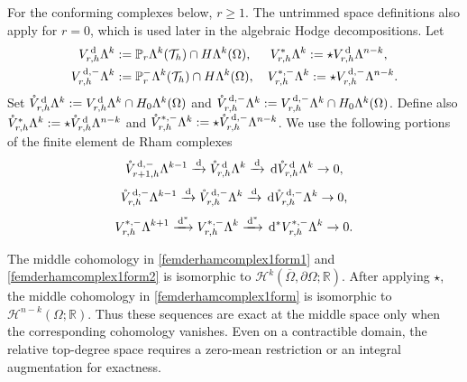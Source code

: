 \documentclass[10pt]{amsart}
\numberwithin{equation}{section}
\newcommand{\dd}{\,{\rm d}}
\begin{document}
For the conforming complexes below, $r\geq1$.
The untrimmed space definitions also apply for $r=0$, which is used later in the algebraic Hodge decompositions.
Let 
\begin{align*}
	V_{r,h}^{\dd}\Lambda^k&:=\mathbb P_{r}\Lambda^{k}(\mathcal T_h)\cap H\Lambda^k(\Omega),\quad\;\, V_{r,h}^{*}\Lambda^k:=\star V_{r,h}^{\dd}\Lambda^{n-k},\\
	V_{r,h}^{\dd,-}\Lambda^k&:=\mathbb P_{r}^-\Lambda^{k}(\mathcal T_h)\cap H\Lambda^k(\Omega),\quad V_{r,h}^{*,-}\Lambda^k:=\star V_{r,h}^{\dd,-}\Lambda^{n-k}.
\end{align*}
Set $\mathring{V}_{r,h}^{\dd}\Lambda^k:=V_{r,h}^{\dd}\Lambda^k\cap H_{0}\Lambda^k(\Omega)$ and $\mathring{V}_{r,h}^{\dd,-}\Lambda^k:=V_{r,h}^{\dd,-}\Lambda^k\cap H_{0}\Lambda^k(\Omega)$.
Define also $\mathring V_{r,h}^{*}\Lambda^k:=\star\mathring V_{r,h}^{\dd}\Lambda^{n-k}$ and $\mathring V_{r,h}^{*,-}\Lambda^k:=\star\mathring V_{r,h}^{\dd,-}\Lambda^{n-k}$.
We use the following portions of the finite element de Rham complexes \cite{Hiptmair2001,Hiptmair2002,Arnold2018,ArnoldFalkWinther2006}
\begin{equation}\label{femderhamcomplex1form1}
	\mathring{V}_{r+1,h}^{\dd,-}\Lambda^{k-1}\xrightarrow{\dd} 
	\mathring{V}_{r,h}^{\dd}\Lambda^k\xrightarrow{\dd} \dd \mathring{V}_{r,h}^{\dd}\Lambda^k \to0,
\end{equation}
\begin{equation}\label{femderhamcomplex1form2}
	\mathring{V}_{r,h}^{\dd,-}\Lambda^{k-1}\xrightarrow{\dd} 
	\mathring{V}_{r,h}^{\dd,-}\Lambda^k\xrightarrow{\dd} \dd \mathring{V}_{r,h}^{\dd,-}\Lambda^k \to0,
\end{equation}
\begin{equation}\label{femderhamcomplex1form}
	V_{r,h}^{*,-}\Lambda^{k+1} \xrightarrow{\dd^*} 
	V_{r,h}^{*,-}\Lambda^k\xrightarrow{\dd^*} \dd^* V_{r,h}^{*,-}\Lambda^k \to0.
\end{equation}

The middle cohomology in \eqref{femderhamcomplex1form1} and
\eqref{femderhamcomplex1form2} is isomorphic to
$\mathscr H^k(\overline\Omega,\partial\Omega;\mathbb R)$.
After applying $\star$, the middle cohomology in
\eqref{femderhamcomplex1form} is isomorphic to
$\mathscr H^{n-k}(\Omega;\mathbb R)$.
Thus these sequences are exact at the middle space only when the corresponding cohomology vanishes.
Even on a contractible domain, the relative top-degree space requires a zero-mean restriction or an integral augmentation for exactness.
\end{document}
